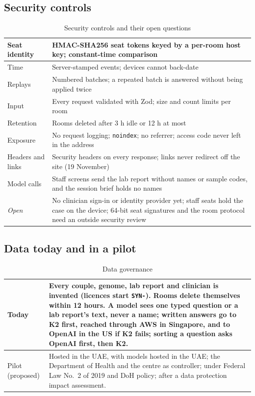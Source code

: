 \documentclass[10.5pt,a4paper]{article}
\newcommand{\toprl}{\arrayrulecolor{ink}\toprule\arrayrulecolor{rule}}
\newcommand{\code}[1]{\texttt{\small #1}}
\begin{document}
\subsection{Security controls}

{\small
\begin{xltabular}{\textwidth}{@{}P{3.6cm}L@{}}
\caption{Security controls and their open questions}\\
\toprl
Seat identity & HMAC-SHA256 seat tokens keyed by a per-room host key; constant-time comparison\\
\midrule
Time & Server-stamped events; devices cannot back-date\\
\midrule
Replays & Numbered batches; a repeated batch is answered without being applied twice\\
\midrule
Input & Every request validated with Zod; size and count limits per room\\
\midrule
Retention & Rooms deleted after 3 h idle or 12 h at most\\
\midrule
Exposure & No request logging; \code{noindex}; no referrer; access code never left in the address\\
\midrule
Headers and links & Security headers on every response; links never redirect off the site (19 November)\\
\midrule
Model calls & Staff screens send the lab report without names or sample codes, and the session brief holds no names\\
\midrule
\textit{Open} & No clinician sign-in or identity provider yet; staff seats hold the case on the device; 64-bit seat signatures and the room protocol need an outside security review\\
\bottomrule
\end{xltabular}}

\subsection{Data today and in a pilot}

{\small
\begin{xltabular}{\textwidth}{@{}P{2.6cm}L@{}}
\caption{Data governance}\\
\toprl
Today & Every couple, genome, lab report and clinician is invented (licences start \code{SYN-}). Rooms delete themselves within 12 hours. A model sees one typed question or a lab report's text, never a name; written answers go to K2 first, reached through AWS in Singapore, and to OpenAI in the US if K2 fails; sorting a question asks OpenAI first, then K2.\\
\midrule
Pilot (proposed) & Hosted in the UAE, with models hosted in the UAE; the Department of Health and the centre as controller; under Federal Law No.~2 of 2019 and DoH policy; after a data protection impact assessment.\\
\bottomrule
\end{xltabular}}
\end{document}
